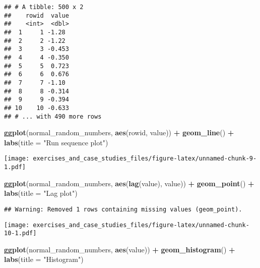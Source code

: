 \documentclass[]{book}
\newenvironment{Shaded}{\begin{snugshade}}{\end{snugshade}}
\newcommand{\DataTypeTok}[1]{\textcolor[rgb]{0.13,0.29,0.53}{#1}}
\newcommand{\KeywordTok}[1]{\textcolor[rgb]{0.13,0.29,0.53}{\textbf{#1}}}
\newcommand{\NormalTok}[1]{#1}
\newcommand{\OperatorTok}[1]{\textcolor[rgb]{0.81,0.36,0.00}{\textbf{#1}}}
\newcommand{\StringTok}[1]{\textcolor[rgb]{0.31,0.60,0.02}{#1}}
\theoremstyle{definition}
\theoremstyle{definition}
\theoremstyle{definition}
\theoremstyle{remark}
\begin{document}
\begin{verbatim}
## # A tibble: 500 x 2
##    rowid  value
##    <int>  <dbl>
##  1     1 -1.28 
##  2     2 -1.22 
##  3     3 -0.453
##  4     4 -0.350
##  5     5  0.723
##  6     6  0.676
##  7     7 -1.10 
##  8     8 -0.314
##  9     9 -0.394
## 10    10 -0.633
## # ... with 490 more rows
\end{verbatim}

\begin{Shaded}
\begin{Highlighting}[]
\KeywordTok{ggplot}\NormalTok{(normal_random_numbers, }\KeywordTok{aes}\NormalTok{(rowid, value)) }\OperatorTok{+}
\StringTok{  }\KeywordTok{geom_line}\NormalTok{() }\OperatorTok{+}
\StringTok{  }\KeywordTok{labs}\NormalTok{(}\DataTypeTok{title =} \StringTok{"Run sequence plot"}\NormalTok{)}
\end{Highlighting}
\end{Shaded}

\texttt{[image: exercises\_and\_case\_studies\_files/figure-latex/unnamed-chunk-9-1.pdf]}

\begin{Shaded}
\begin{Highlighting}[]
\KeywordTok{ggplot}\NormalTok{(normal_random_numbers, }\KeywordTok{aes}\NormalTok{(}\KeywordTok{lag}\NormalTok{(value), value)) }\OperatorTok{+}
\StringTok{  }\KeywordTok{geom_point}\NormalTok{() }\OperatorTok{+}
\StringTok{  }\KeywordTok{labs}\NormalTok{(}\DataTypeTok{title =} \StringTok{"Lag plot"}\NormalTok{)}
\end{Highlighting}
\end{Shaded}

\begin{verbatim}
## Warning: Removed 1 rows containing missing values (geom_point).
\end{verbatim}

\texttt{[image: exercises\_and\_case\_studies\_files/figure-latex/unnamed-chunk-10-1.pdf]}

\begin{Shaded}
\begin{Highlighting}[]
\KeywordTok{ggplot}\NormalTok{(normal_random_numbers, }\KeywordTok{aes}\NormalTok{(value)) }\OperatorTok{+}
\StringTok{  }\KeywordTok{geom_histogram}\NormalTok{() }\OperatorTok{+}
\StringTok{  }\KeywordTok{labs}\NormalTok{(}\DataTypeTok{title =} \StringTok{"Histogram"}\NormalTok{)}
\end{Highlighting}
\end{Shaded}
\end{document}
